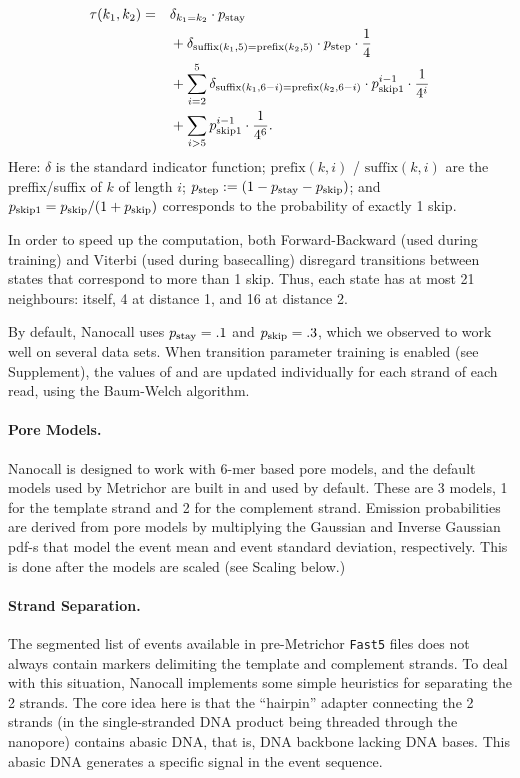 \documentclass{bioinfo}
\begin{document}
\begin{methods}
\begin{align*}
\tau(k_1, k_2) = \quad &
\delta_{k_1 = k_2} \cdot p_\mathrm{stay}
\\
& + \delta_{\mathrm{suffix}(k_1, 5) = \mathrm{prefix}(k_2, 5)} \cdot p_\mathrm{step} \cdot \frac{1}{4}
\\
& + \sum_{i=2}^5 \delta_{\mathrm{suffix}(k_1, 6-i) = \mathrm{prefix}(k_2, 6-i)} \cdot p_\mathrm{skip1}^{i-1} \cdot \frac{1}{4^i}
\\
& + \sum_{i>5} p_\mathrm{skip1}^{i-1} \cdot \frac{1}{4^6}.
\end{align*}
Here: $\delta$ is the standard indicator function; $\mathrm{prefix}(k,i)$ / $\mathrm{suffix}(k,i)$ are the preffix/suffix of $k$ of length $i$; $p_\mathrm{step} := (1 - p_\mathrm{stay} - p_\mathrm{skip})$; and $p_\mathrm{skip1} = p_\mathrm{skip} / (1 + p_\mathrm{skip})$ corresponds to the probability of exactly 1 skip.

In order to speed up the computation, both Forward-Backward (used during training) and Viterbi (used during basecalling) disregard transitions between states that correspond to more than 1 skip. Thus, each state has at most 21 neighbours: itself, 4 at distance 1, and 16 at distance 2.

By default, Nanocall uses $p_\mathrm{stay} = .1$ and $p_\mathrm{skip} = .3$, which we observed to work well on several data sets. When transition parameter training is enabled (see Supplement), the values of \pstay and \pskip are updated individually for each strand of each read, using the Baum-Welch algorithm.

\paragraph{Pore Models.}
Nanocall is designed to work with 6-mer based pore models, and the default models used by Metrichor are built in and used by default. These are 3 models, 1 for the template strand and 2 for the complement strand. Emission probabilities are derived from pore models by multiplying the Gaussian and Inverse Gaussian pdf-s that model the event mean and event standard deviation, respectively. This is done after the models are scaled (see Scaling below.)

\paragraph{Strand Separation.}
The segmented list of events available in pre-Metrichor \texttt{Fast5} files does not always contain markers delimiting the template and complement strands. To deal with this situation, Nanocall implements some simple heuristics for separating the 2 strands. The core idea here is that the ``hairpin'' adapter connecting the 2 strands (in the single-stranded DNA product being threaded through the nanopore) contains abasic DNA, that is, DNA backbone lacking DNA bases. This abasic DNA generates a specific signal in the event sequence.


\end{methods}
\end{document}
